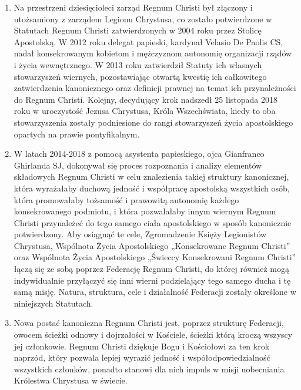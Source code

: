 ﻿\documentclass{book}
\begin{document}
\begin{enumerate}
\item Na przestrzeni dziesięcioleci zarząd Regnum Christi był złączony i utożsamiony z zarządem Legionu Chrystusa, co zostało potwierdzone w Statutach Regnum Christi zatwierdzonych w 2004 roku przez Stolicę Apostolską. W 2012 roku delegat papieski, kardynał Velasio De Paolis CS, nadał konsekrowanym kobietom i mężczyznom autonomię organizacji rządów i życia wewnętrznego. W 2013 roku zatwierdził Statuty ich własnych stowarzyszeń wiernych, pozostawiając otwartą kwestię ich całkowitego zatwierdzenia kanonicznego oraz definicji prawnej na temat ich przynależności do Regnum Christi. Kolejny, decydujący krok nadszedł 25 listopada 2018 roku w uroczystość Jezusa Chrystusa, Króla Wszechświata, kiedy to oba stowarzyszenia zostały podniesione do rangi stowarzyszeń życia apostolskiego opartych na prawie pontyfikalnym.


\item W latach 2014-2018 z pomocą asystenta papieskiego, ojca Gianfranco Ghirlanda SJ, dokonywał się proces rozpoznania i analizy elementów składowych Regnum Christi w celu znalezienia takiej struktury kanonicznej, która wyrażałaby duchową jedność i współpracę apostolską wszystkich osób, która promowałaby tożsamość i prawowitą autonomię każdego konsekrowanego podmiotu, i która pozwalałaby innym wiernym Regnum Christi przynależeć do tego samego ciała apostolskiego w sposób kanonicznie potwierdzony. Aby osiągnąć te cele, Zgromadzenie Księży Legionistów Chrystusa, Wspólnota Życia Apostolskiego „Konsekrowane Regnum Christi” oraz Wspólnota Życia Apostolskiego „Świeccy Konsekrowani Regnum Christi” łączą się ze sobą poprzez Federację Regnum Christi, do której również mogą indywidualnie przyłączyć się inni wierni podzielający tego samego ducha i tę samą misję. Natura, struktura, cele i działalność Federacji zostały określone w niniejszych Statutach.


\item Nowa postać kanoniczna Regnum Christi jest, poprzez strukturę Federacji, owocem ścieżki odnowy i dojrzałości w Kościele, ścieżki którą kroczą wszyscy jej członkowie. Regnum Christi dziękuje Bogu i Kościołowi za ten krok naprzód, który pozwala lepiej wyrazić jedność i współodpowiedzialność wszystkich członków, ponadto stanowi dla nich impuls w misji uobecniania Królestwa Chrystusa w świecie.


\end{enumerate}
\end{document}
